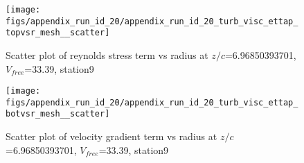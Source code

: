 \begin{figure}[H]
\centering
\texttt{[image: figs/appendix\_run\_id\_20/appendix\_run\_id\_20\_turb\_visc\_ettap\_topvsr\_mesh\_\_scatter]}
\caption{Scatter plot of reynolds stress term vs radius at $z/c$=6.96850393701, $V_{free}$=33.39, station9}
\label{fig:appendix_run_id_20_turb_visc_ettap_topvsr_mesh__scatter}
\end{figure}


\begin{figure}[H]
\centering
\texttt{[image: figs/appendix\_run\_id\_20/appendix\_run\_id\_20\_turb\_visc\_ettap\_botvsr\_mesh\_\_scatter]}
\caption{Scatter plot of velocity gradient term vs radius at $z/c$=6.96850393701, $V_{free}$=33.39, station9}
\label{fig:appendix_run_id_20_turb_visc_ettap_botvsr_mesh__scatter}
\end{figure}


